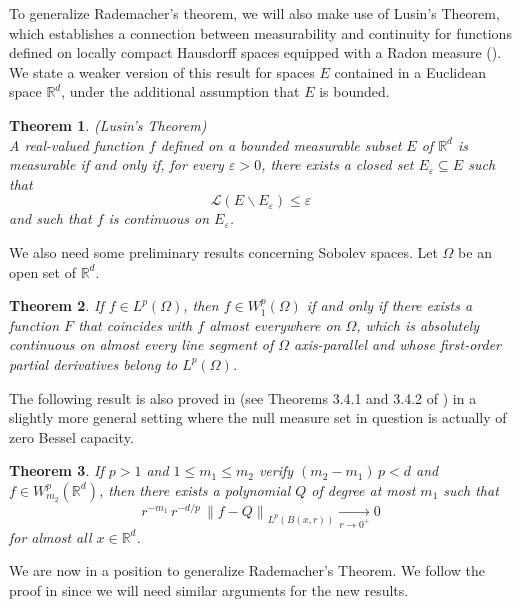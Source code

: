 \documentclass[a4paper,10pt]{article}
\theoremstyle{thmstyleone}%
\newtheorem{theorem}{Theorem}%
\theoremstyle{thmstyletwo}%
\theoremstyle{thmstylethree}%
\renewcommand{\epsilon}{\varepsilon}
\begin{document}
To generalize Rademacher's theorem, we will also make use of Lusin's Theorem, which establishes a connection between measurability and continuity for functions defined on locally compact Hausdorff spaces equipped with a Radon measure (\cite{Luzin:12}). We state a weaker version of this result for spaces $E$ contained in a Euclidean space $\mathbb{R}^d$, under the additional assumption that $E$ is bounded.
\begin{theorem}\emph{(Lusin's Theorem)}
\\A real-valued function $f$ defined on a bounded measurable subset $E$ of $\mathbb{R}^d$ is measurable if and only if, for every $\epsilon>0$, there exists a closed set $E_\epsilon\subseteq E$ such that
\[\mathcal{L}(E\backslash E_\epsilon)\leq \epsilon\] and such that $f$ is continuous on $E_\epsilon$.
\end{theorem}
We also need some preliminary results concerning Sobolev spaces. Let $\Omega$ be an open set of $\mathbb{R}^d$.
\begin{theorem}\label{Thm 1 ziemer sobolev}
If $f\in L^p(\Omega)$, then $f\in W^p_1(\Omega)$ if and only if there exists a function $F$ that coincides with $f$ almost everywhere on $\Omega$, which is absolutely continuous on almost every line segment of $\Omega$ axis-parallel and whose first-order partial derivatives belong to $L^p(\Omega)$.
\end{theorem}
The following result is also proved in \cite{Ziemer:89} (see Theorems 3.4.1 and 3.4.2 of \cite{Ziemer:89}) in a slightly more general setting where the null measure set in question is actually of zero Bessel capacity.
\begin{theorem}\label{Thm 2 ziemer sobolev}
If $p>1$ and $1\leq m_1\leq m_2$ verify $(m_2-m_1)\,p<d$ and $f\in W^p_{m_2}(\mathbb{R}^d)$, then there exists a polynomial $Q$ of degree at most $m_1$ such that
\[r^{-m_1}\,r^{-d/p}\,\left\|f-Q\right\|_{L^p(B(x,r))}\underset{r\rightarrow 0^+}{\longrightarrow}0\]
for almost all $x\in\mathbb{R}^d$.
\end{theorem}

We are now in a position to generalize Rademacher's Theorem. We follow the proof in \cite{Ziemer:89} since we will need similar arguments for the new results.
\end{document}
